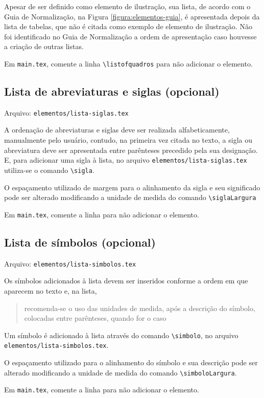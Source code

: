     Apesar de ser definido como elemento de ilustração, sua lista, de acordo com o Guia de Normalização, na Figura \ref{figura:elementos-guia}, é apresentada depois da lista de tabelas, que não é citada como exemplo de elemento de ilustração. Não foi identificado no Guia de Normalização a ordem de apresentação caso houvesse a criação de outras listas.

    Em \texttt{main.tex}, comente a linha \verb|\listofquadros| para não adicionar o elemento.

\subsection{Lista de abreviaturas e siglas (opcional)}
    Arquivo: \texttt{elementos/lista-siglas.tex}

    A ordenação de abreviaturas e siglas deve ser realizada alfabeticamente, manualmente pelo usuário, contudo, na primeira vez citada no texto, a sigla ou abreviatura deve ser apresentada entre parênteses precedido pela sua designação. E, para adicionar uma sigla à lista, no arquivo \texttt{elementos/lista-siglas.tex} utiliza-se o comando \verb|\sigla|.

    O espaçamento utilizado de margem para o alinhamento da sigla e seu significado pode ser alterado modificando a unidade de medida do comando \verb|\siglaLargura|

    Em \texttt{main.tex}, comente a linha \verb|| para não adicionar o elemento.

\subsection{Lista de símbolos (opcional)}
    Arquivo: \texttt{elementos/lista-simbolos.tex}

    Os símbolos adicionados à lista devem ser inseridos conforme a ordem em que aparecem no texto e, na lista, \blockcquote[p. 32]{livro:iffar-guia-normalizacao-2022}{recomenda-se o uso das unidades de medida, após a descrição do símbolo, colocadas entre parênteses, quando for o caso}. Um símbolo é adicionado à lista através do comando \verb|\simbolo|, no arquivo \texttt{elementos/lista-simbolos.tex}.

    O espaçamento utilizado para o alinhamento do símbolo e sua descrição pode ser alterado modificando a unidade de medida do comando \verb|\simboloLargura|.

    Em \texttt{main.tex}, comente a linha \verb|| para não adicionar o elemento.
    
